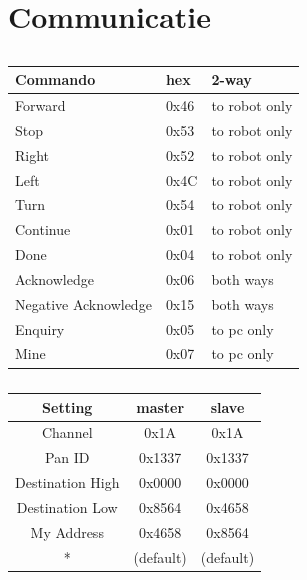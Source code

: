 \documentclass{report}
\begin{document}
\section{Communicatie}
\label{sec:communicatie}
\begin{table}[H]
\centering
\caption{}
\begin{subtable}{0.48\textwidth}
\label{tab:comProtocol}
\centering
\begin{tabular}{@{}lll@{}}
\toprule
\textbf{Commando} & \textbf{hex} & \textbf{2-way} \\
\midrule
Forward				& 0x46 	& to robot only\\
Stop 					& 0x53 	& to robot only\\
Right 					& 0x52 	& to robot only\\
Left 					& 0x4C 	& to robot only\\
Turn					& 0x54 	& to robot only\\
Continue				& 0x01	& to robot only\\
Done 					& 0x04	& to robot only\\
Acknowledge 			& 0x06	& both ways\\
Negative Acknowledge 		& 0x15	& both ways \\
Enquiry 				& 0x05	& to pc only\\
Mine 					& 0x07	& to pc only\\
\bottomrule
\end{tabular}
\end{subtable}
\quad
\begin{subtable}{0.48\textwidth}
\label{tab:XBeeSettings}
\centering
\begin{tabular}{@{}ccc@{}}
\toprule
\textbf{Setting} & \textbf{master}& \textbf{slave} \\
\midrule
Channel				& 0x1A 	& 0x1A\\
Pan ID				& 0x1337 	& 0x1337\\
Destination High			& 0x0000	& 0x0000\\
Destination Low			& 0x8564 	& 0x4658\\
My Address				& 0x4658 	& 0x8564\\
*		 			& (default)	&(default)\\
\bottomrule
\end{tabular}
\end{subtable}
\end{table}
\end{document}

